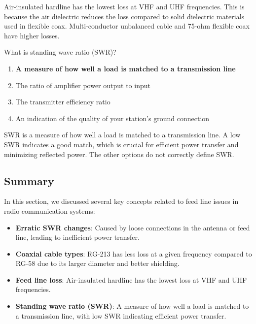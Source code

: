 Air-insulated hardline has the lowest loss at VHF and UHF frequencies. This is because the air dielectric reduces the loss compared to solid dielectric materials used in flexible coax. Multi-conductor unbalanced cable and 75-ohm flexible coax have higher losses.


\begin{tcolorbox}[colback=gray!10!white,colframe=black!75!black,title={T9B12}]
What is standing wave ratio (SWR)?
\begin{enumerate}[label=\Alph*,noitemsep]
    \item \textbf{A measure of how well a load is matched to a transmission line}
    \item The ratio of amplifier power output to input
    \item The transmitter efficiency ratio
    \item An indication of the quality of your station’s ground connection
\end{enumerate}
\end{tcolorbox}

SWR is a measure of how well a load is matched to a transmission line. A low SWR indicates a good match, which is crucial for efficient power transfer and minimizing reflected power. The other options do not correctly define SWR.


\subsection*{Summary}
In this section, we discussed several key concepts related to feed line issues in radio communication systems:

\begin{itemize}
    \item \textbf{Erratic SWR changes}: Caused by loose connections in the antenna or feed line, leading to inefficient power transfer.
    \item \textbf{Coaxial cable types}: RG-213 has less loss at a given frequency compared to RG-58 due to its larger diameter and better shielding.
    \item \textbf{Feed line loss}: Air-insulated hardline has the lowest loss at VHF and UHF frequencies.
    \item \textbf{Standing wave ratio (SWR)}: A measure of how well a load is matched to a transmission line, with low SWR indicating efficient power transfer.
\end{itemize}

